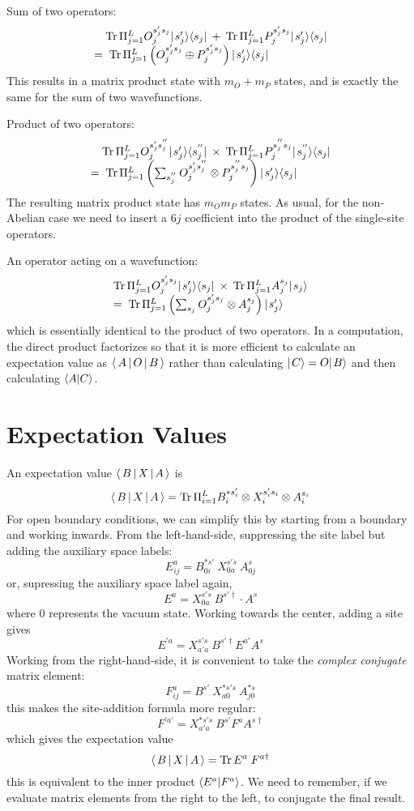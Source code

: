 \documentclass[12pt]{article}
\begin{document}
Sum of two operators:
\[
\begin{array}{l}
\quad \mathop{\rm Tr} \Pi_{j=1}^L O^{s'_j s_j}_j \hbox{$\mid \! {s'_j} \rangle$} \langle s_j |
\: + \:
\mathop{\rm Tr} \Pi_{j=1}^L P^{s'_j s_j}_j \hbox{$\mid \! {s'_j} \rangle$} \langle s_j |
\\
= \; \mathop{\rm Tr} \Pi_{j=1}^L \left( O^{s'_j s_j}_j \oplus P^{s'_j s_j}_j \right)
 \hbox{$\mid \! {s'_j} \rangle$} \langle s_j |
\end{array}
\]
This results in a matrix product state with $m_O + m_P$ states, and
is exactly the same for the sum of two wavefunctions.

Product of two operators:
\[
\begin{array}{l}
\quad \mathop{\rm Tr} \Pi_{j=1}^L O^{s'_j s^{''}_j}_j \hbox{$\mid \! {s'_j} \rangle$} \langle s^{''}_j |
\: \times \:
\mathop{\rm Tr} \Pi_{j=1}^L P^{s^{''}_j s_j}_j \hbox{$\mid \! {s^{''}_j} \rangle$} \langle s_j |
\\
= \; \mathop{\rm Tr} \Pi_{j=1}^L \left( \sum_{s^{''}_j} O^{s'_j s^{''}_j}_j \otimes 
  P^{s^{''}_j s_j}_j \right)
 \hbox{$\mid \! {s'_j} \rangle$} \langle s_j |
\end{array}
\]
The resulting matrix
product state has $m_O m_P$ states.
As usual, for the non-Abelian case we need to insert a $6j$ coefficient
into the product of the single-site operators. 

An operator acting on a wavefunction:
\[
\begin{array}{l}
\mathop{\rm Tr} \Pi_{j=1}^L O^{s'_j s_j}_j \hbox{$\mid \! {s'_j} \rangle$} \langle s_j |
\: \times \: \mathop{\rm Tr} \Pi_{j=1}^L A^{s_j}_j \hbox{$\mid \! {s_j} \rangle$}
\\ = \;
\mathop{\rm Tr} \Pi_{j=1}^L
\left( \sum_{s_j} O^{s'_j s_j}_j \otimes A^{s_j}_j \right) \hbox{$\mid \! {s'_j} \rangle$}
\end{array}
\]
which is essentially identical to the product of two operators.
In a computation, the direct product factorizes so that it is more
efficient to calculate an expectation value as
$\langle \, A \, | \, O \, | \, B \, \rangle$ rather than calculating $\hbox{$\mid \! {C} \rangle$} = O\hbox{$\mid \! {B} \rangle$}$
and then calculating $\langle A | C \rangle$.

\section{Expectation Values}

An expectation value $\langle \, B \, | \, X \, | \, A \, \rangle$ is
\[
\langle \, B \, | \, X \, | \, A \, \rangle = \mathop{\rm Tr} \Pi_{i=1}^{L} B^{*s'_i}_i \otimes X^{s_i's_i}_i \otimes A^{s_i}_i
\]
For open boundary conditions, we can simplify this by starting from a boundary and working inwards.
From the left-hand-side, suppressing the site label but adding the auxiliary space labels:
\[
E^a_{ij} = B^{*s'}_{0i} \: X^{s's}_{0a} \: A^s_{0j}
\]
or, supressing the auxiliary space label again,
\[
E^a = X^{s's}_{0a} \: B^{s' \dagger} \cdot A^s
\]
where $0$ represents the vacuum state.
Working towards the center, adding a site gives
\[
E^{'a} = X^{s's}_{a'a} \: B^{s' \dagger} E^{a'} A^s
\]
Working from the right-hand-side, it is convenient to take the \textit{complex conjugate} matrix element:
\[
F^a_{ij} = B^{s'} \: X^{*s's}_{a0} \: A^{*s}_{j0}
\]
this makes the site-addition formula more regular:
\[
F^{'a'} = X^{*s's}_{a'a} \: B^{s'} F^a A^{s \dagger}
\]
which gives the expectation value
\[
\langle \, B \, | \, X \, | \, A \, \rangle = \mathop{\rm Tr} E^a \; F^{a \dagger}
\]
this is equivalent to the inner product $\langle E^a | F^a \rangle$.  We need to remember, if we evaluate
matrix elements from the right to the left, to conjugate the final result.
\end{document}
